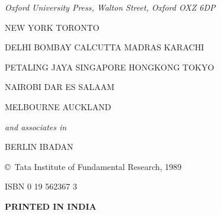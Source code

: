 \begin{center}
{\em Oxford University Press, Walton Street, Oxford OXZ 6DP}
\medskip

NEW YORK TORONTO

DELHI BOMBAY CALCUTTA MADRAS KARACHI

PETALING JAYA SINGAPORE HONGKONG TOKYO

NAIROBI DAR ES SALAAM

MELBOURNE AUCKLAND

\medskip

\textit{and associates in }

BERLIN IBADAN

\bigskip

\vskip 1cm

\copyright\ Tata Institute of Fundamental Research, 1989

\bigskip

\bigskip
ISBN 0 19 562367 3

\vfill


\medskip
\textbf{PRINTED IN INDIA}
\end{center}

\eject
